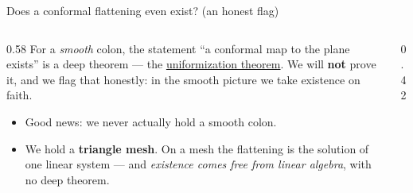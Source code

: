 \documentclass[aspectratio=169,10pt]{beamer}
\begin{document}
\begin{frame}{Does a conformal flattening even exist? (an honest flag)}
  \begin{columns}[T]
    \begin{column}{0.58\textwidth}
      For a \emph{smooth} colon, the statement ``a conformal map to the plane exists'' is a deep theorem --- the \href{https://en.wikipedia.org/wiki/Uniformization_theorem}{uniformization theorem}. We will \textbf{not} prove it, and we flag that honestly: in the smooth picture we take existence on faith.
      \begin{itemize}
        \item Good news: we never actually hold a smooth colon.
        \item We hold a \textbf{triangle mesh}. On a mesh the flattening is the solution of one linear system --- and \emph{existence comes free from linear algebra}, with no deep theorem.
      \end{itemize}
    \end{column}
    \begin{column}{0.42\textwidth}
    \end{column}
  \end{columns}
\end{frame}

\end{document}
